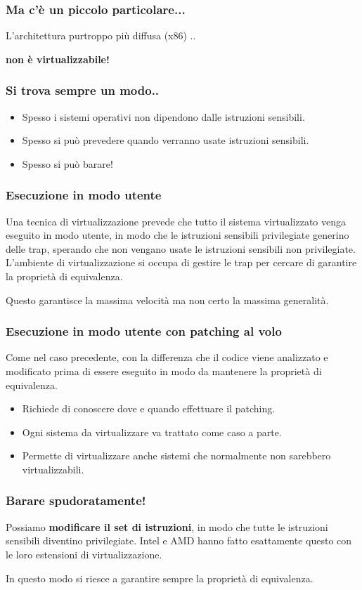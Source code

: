 \documentclass[ignorenonframetext]{beamer}
\begin{document}
  \begin{frame}
  \frametitle{Ma c'è un piccolo particolare...}
  L'architettura purtroppo più diffusa (x86) ..
  
  \textbf{non è virtualizzabile!}
  \end{frame}
  
  \begin{frame}
  \frametitle{Si trova sempre un modo..}
  \begin{itemize}
  \item Spesso i sistemi operativi non dipendono dalle istruzioni sensibili. 
  \item Spesso si può prevedere quando verranno usate istruzioni sensibili.
  \item Spesso si può barare!
  \end{itemize}
  \end{frame}
  
  \begin{frame}
  \frametitle{Esecuzione in modo utente}
  Una tecnica di virtualizzazione prevede che tutto il sistema virtualizzato
  venga eseguito in modo utente, in modo che le istruzioni sensibili
  privilegiate generino delle trap, sperando che non vengano usate le
  istruzioni sensibili non privilegiate. L'ambiente di virtualizzazione si
  occupa di gestire le trap per cercare di garantire la proprietà di equivalenza.
  
  Questo garantisce la massima velocità ma non certo la massima generalità.
  \end{frame}
  
  \begin{frame}
  \frametitle{Esecuzione in modo utente con patching al volo}
  Come nel caso precedente, con la differenza che il codice viene analizzato
  e modificato prima di essere eseguito in modo da mantenere la proprietà di
  equivalenza. 
  
  \begin{itemize}
  \item Richiede di conoscere dove e quando effettuare il patching.
  \item Ogni sistema da virtualizzare va trattato come caso a parte.
  \item Permette di virtualizzare anche sistemi che normalmente non
  sarebbero virtualizzabili.
  \end{itemize}
  \end{frame}
  
  \begin{frame}
  \frametitle{Barare spudoratamente!}
  Possiamo \textbf{modificare il set di istruzioni}, in modo che
  tutte le istruzioni sensibili diventino privilegiate. Intel e AMD hanno
  fatto esattamente questo con le loro estensioni di virtualizzazione.
  
  In questo modo si riesce a garantire sempre la proprietà di equivalenza.
  \end{frame}
  
\end{document}
